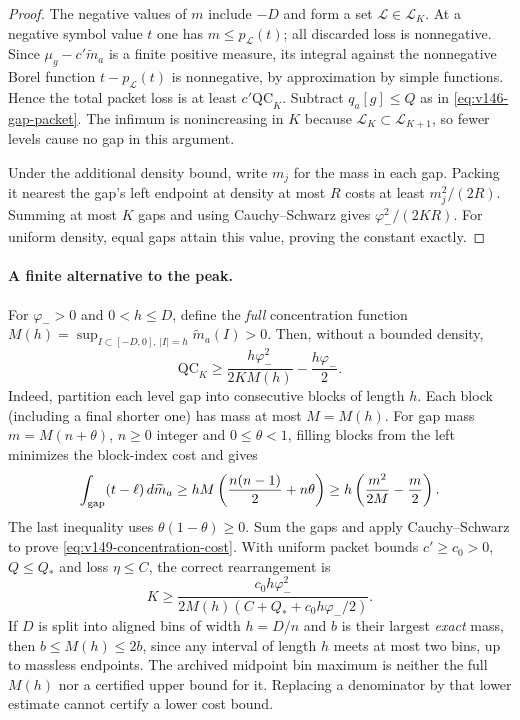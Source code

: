 \documentclass[11pt]{article}
\theoremstyle{remark}
\begin{document}
\begin{proof}
The negative values of $m$ include $-D$ and form a set
$\mathcal L\in\mathcal L_K$. At a negative symbol value $t$ one has
$m\le p_{\mathcal L}(t)$; all discarded loss is nonnegative. Since
$\mu_g-c'\widetilde m_a$ is a finite positive measure, its integral
against the nonnegative Borel function $t-p_{\mathcal L}(t)$ is
nonnegative, by approximation by simple functions. Hence the total
packet loss is at least $c'\mathrm{QC}_K$. Subtract $q_a[g]\le Q$ as
in \eqref{eq:v146-gap-packet}. The infimum is nonincreasing in $K$
because $\mathcal L_K\subset\mathcal L_{K+1}$, so fewer levels cause
no gap in this argument.

Under the additional density bound, write $m_j$ for the mass in each
gap. Packing it nearest the gap's left endpoint at density at most
$R$ costs at least $m_j^2/(2R)$. Summing at most $K$ gaps and using
Cauchy--Schwarz gives $\varphi_-^2/(2KR)$. For uniform density, equal
gaps attain this value, proving the constant exactly.
\end{proof}

\paragraph{A finite alternative to the peak.}
For $\varphi_->0$ and $0<h\le D$, define the \emph{full} concentration
function $M(h)=\sup_{I\subset[-D,0],\,|I|=h}\widetilde m_a(I)>0$.
Then, without a bounded density,
\begin{equation}\label{eq:v149-concentration-cost}
 \mathrm{QC}_K\ge\frac{h\varphi_-^2}{2KM(h)}-\frac{h\varphi_-}{2}.
\end{equation}
Indeed, partition each level gap into consecutive blocks of length $h$.
Each block (including a final shorter one) has mass at most $M=M(h)$.
For gap mass $m=M(n+\theta)$, $n\ge0$ integer and $0\le\theta<1$, filling
blocks from the left minimizes the block-index cost and gives
\[
 \int_{\rm gap}(t-\ell)\,d\widetilde m_a
 \ge hM\left(\frac{n(n-1)}2+n\theta\right)
 \ge h\left(\frac{m^2}{2M}-\frac m2\right).
\]
The last inequality uses $\theta(1-\theta)\ge0$. Sum the gaps and apply
Cauchy--Schwarz to prove \eqref{eq:v149-concentration-cost}.
With uniform packet bounds $c'\ge c_0>0$, $Q\le Q_*$ and loss $\eta\le C$,
the correct rearrangement is
\begin{equation}\label{eq:v149-concentration-rearrangement}
 K\ge\frac{c_0h\varphi_-^2}
 {2M(h)(C+Q_*+c_0h\varphi_-/2)}.
\end{equation}
If $D$ is split into aligned bins of width $h=D/n$ and $b$ is their
largest \emph{exact} mass, then $b\le M(h)\le2b$, since any interval
of length $h$ meets at most two bins, up to massless endpoints.
The archived midpoint bin maximum is neither the full $M(h)$ nor a
certified upper bound for it. Replacing a denominator by that lower
estimate cannot certify a lower cost bound.
\end{document}
